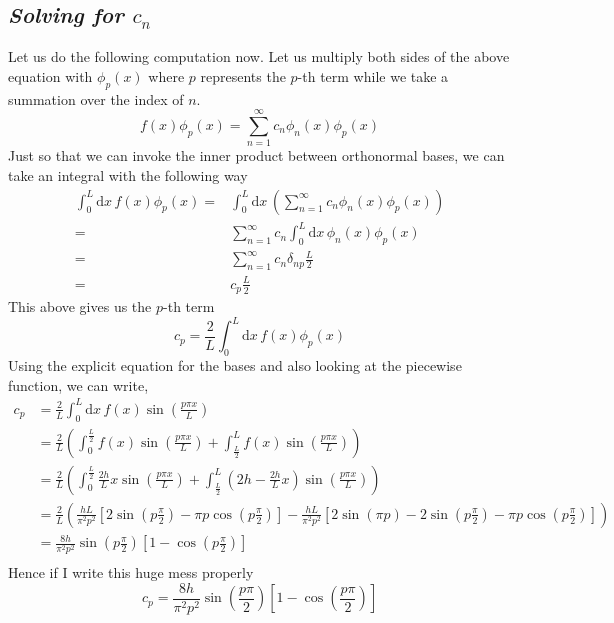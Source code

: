 \documentclass[letter, 10pts]{article}
\begin{document}
\subsection*{\emph{Solving for $c_n$} }
Let us do the following computation now. Let us multiply both sides of the above equation with $\phi_p(x)$ where $p$ represents the  $p$-th term while we take a summation over the index of $n$.
\[
f(x) \phi_p (x) = \sum_{n=1}^{\infty} c_n \phi_n(x) \phi_p(x)
\]
Just so that we can invoke the inner product between orthonormal bases, we can take an integral with the following way
\begin{align*}
	\int_{0}^{L} \mathrm{d} x \,  f(x) \phi_p(x) =& \int_{0}^{L} \mathrm{d} x\,  \left(
 \sum_{n=1}^{\infty} c_n \phi_n(x) \phi_p(x) \right) \\ 
		=& \sum_{n=1}^{\infty} c_n \int_{0}^{L} \mathrm{d} x \, \phi_n(x) \phi_p(x)  \\
		=& \sum_{n=1}^{\infty} c_n \delta_{np} \frac{L}{2} \\
		=& c_p \frac{L}{2}
\end{align*}
This above gives us the $p$-th term
\[
c_p = \frac{2}{L} \int_{0}^{L} \mathrm{d} x \, f(x) \phi_p(x)  
\] 
Using the explicit equation for the bases and also looking at the piecewise function, we can write, 
\begin{align*}
	c_p &= \frac{2}{L} \int_{0}^{L} \mathrm{d} x \, f(x) \sin \left( \frac{p \pi x }{L}\right)  \\
	&= \frac{2}{L} 
	\left( \int_{0}^{\frac{L}{2}}  f(x) \sin\left(\frac{p \pi x}{L}\right) + 
	\int_{\frac{L}{2}}^{L} f(x) \sin \left(\frac{p \pi x}{L}\right)  \right)\\
	&= \frac{2}{L} 
	\left(
	\int_{0}^{\frac{L}{2} } \frac{2h}{L} x \sin\left(\frac{p \pi x}{L}\right) +
	\int_{\frac{L}{2}}^{L} \left(2 h - \frac{2h}{L} x \right) \sin \left(\frac{p \pi x}{L}\right) 
	\right)\\
	&= 
	\frac{2}{L} 
	\left(
\frac{hL}{\pi ^2 p^2 } \left[ 
2 \sin \left(p \frac{\pi}{2} \right) - \pi p \cos \left(p \frac{\pi}{2}\right)
\right]  - \frac{hL}{\pi ^2 p ^2} 
\left[
	2 \sin\left(\pi p \right) - 2 \sin \left(p \frac{\pi}{2}\right) - \pi p \cos \left(p \frac{\pi}{ 2}\right)
\right]
	\right)\\ 
	&= \frac{8h}{\pi ^2 p^2} \sin \left(p \frac{\pi}{2}\right) \left[1 - \cos \left(p \frac{\pi}{2}\right)\right] \\
\end{align*}
Hence if I write this huge mess properly
\[
\boxed{
	c_p = \frac{8h}{\pi ^2 p ^2} \sin\left(\frac{p \pi }{2}\right) \left[ 1 - \cos \left(\frac{p \pi }{2}\right) \right]
}
\] 
\end{document}
